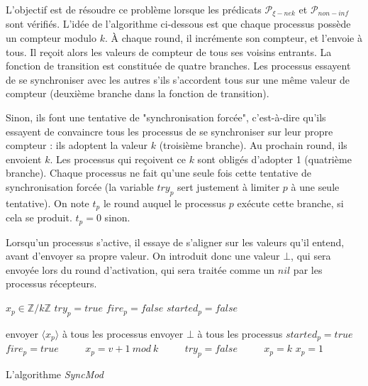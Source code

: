 \documentclass{article}
\begin{document}
L'objectif est de résoudre ce problème lorsque les prédicats $\mathcal{P}_{\xi-nek}$ et $\mathcal{P}_{non-inf}$ sont vérifiés.
L'idée de l'algorithme ci-dessous est que chaque processus possède un compteur modulo $k$. À chaque round, il incrémente son compteur, et l'envoie à tous.
Il reçoit alors les valeurs de compteur de tous ses voisins entrants.
La fonction de transition est constituée de quatre branches.
Les processus essayent de se synchroniser avec les autres s'ils s'accordent tous sur une même valeur de compteur (deuxième branche dans la fonction de transition).

Sinon, ils font une tentative de "synchronisation forcée", c'est-à-dire qu'ils essayent de convaincre tous les processus de se synchroniser sur leur propre compteur :
ils adoptent la valeur $k$ (troisième branche). Au prochain round, ils envoient $k$.  Les processus qui reçoivent ce $k$ sont obligés d'adopter 1 (quatrième branche).
Chaque processus ne fait qu'une seule fois cette tentative de synchronisation forcée (la variable $try_p$ sert justement à limiter $p$ à une seule tentative).
On note $t_p$ le round auquel le processus $p$ exécute cette branche, si cela se produit. $t_p = 0$ sinon.

Lorsqu'un processus s'active, il essaye de s'aligner sur les valeurs qu'il entend, avant d'envoyer sa propre valeur.
On introduit donc une valeur $\bot$, qui sera envoyée lors du round d'activation, qui sera traitée comme un $nil$ par les processus récepteurs.

\pagebreak[1]

\begin{algorithm}[htb]
\begin{distribalgo}[1]
\BLANK {}
	\STATE $x_p \in \mathds{Z}/k\mathds{Z}$
	\STATE $try_p = true$
	\STATE $fire_p = false$
	\STATE $started_p = false$

\ENDINDENT \BLANK

			\STATE envoyer $\langle x_p \rangle$ à tous les processus
		\ELSE
			\STATE envoyer $\bot$ à tous les processus
		\ENDIF
	\ENDINDENT
	\BLANK
		\STATE $started_p = true$
			\STATE $fire_p = true$ ~~~~
		\ENDIF
			\STATE $x_p = v+1~mod~k$ ~~~~
			\STATE $try_p = false$ ~~~~
			\STATE $x_p = k$
		\ELSE
			\STATE $x_p = 1$ ~~~~
		\ENDIF
	\ENDINDENT
\ENDINDENT 
\caption{L'algorithme {\em SyncMod}} \label{algo:R}
\end{distribalgo}

\end{algorithm}
\end{document}
